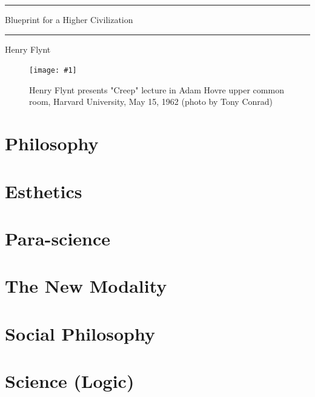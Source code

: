 \documentclass[10pt,twoside]{memoir}
\begin{document}
\frontmatter
\graphicspath{{img/}}
\pagestyle{ruled}
\openany

\renewcommand*{\cftpartfont}{\bfseries\scshape}
\renewcommand*{\cftchapterfont}{\normalfont}
\renewcommand*{\cftsectionfont}{\itshape}

\thispagestyle{empty}
{
	\centering\sffamily

	\plainbreak{3}

	{ \Large
	Blueprint for a Higher Civilization \par}

	\plainbreak{3}

	{ \large Henry Flynt \par}
}

\clearpage

\newcommand{\photopage}[3]{
	\begin{figure}[!hp]
		\centering
		\texttt{[image: \#1]}
		\caption{#2 (photo by #3)}
	\end{figure}}

\photopage{img/creep}{Henry Flynt presents "Creep" lecture in Adam Hovre upper common room, Harvard University, May 15, 1962}{Tony Conrad}

\tableofcontents*



\mainmatter
\part{Philosophy}







\part{Esthetics}




\part{Para-science}





\part{The New Modality}








\part{Social Philosophy}




\part{Science (Logic)}


\end{document}
